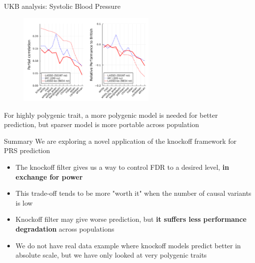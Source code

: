 \documentclass[aspectratio=169, 10pt]{beamer}
\begin{document}

\begin{frame}{UKB analysis: Systolic Blood Pressure}
    \begin{figure}
        \centering
        \includegraphics[width=0.6\textwidth]{figures/ukb_sbp.png}
    \end{figure}
    For highly polygenic trait, a more polygenic model is needed for better prediction, but sparser model is more portable across population
\end{frame}

\begin{frame}{Summary}
We are exploring a novel application of the knockoff framework for PRS prediction
\begin{itemize}
    \item The knockoff filter gives us a way to control FDR to a desired level, \textbf{in exchange for power} 
    \item This trade-off tends to be more "worth it" when the number of causal variants is low
    \item Knockoff filter may give worse prediction, but \textbf{it suffers less performance degradation} across populations
    \item We do not have real data example where knockoff models predict better in absolute scale, but we have only looked at very polygenic traits 
\end{itemize}
\end{frame}
\end{document}
